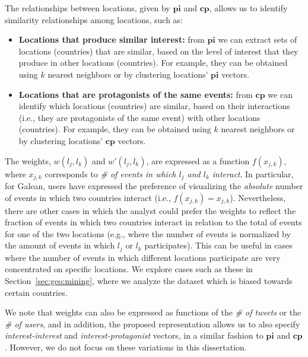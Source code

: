 The relationships between locations, given by $\mathbf{pi}$ and $\mathbf{cp}$,
allows us to identify similarity relationships among locations, such as:

\begin{itemize}
\item{\bf Locations that produce similar interest:} 
%
from $\mathbf{pi}$ we can extract sets of locations (countries) that are
similar, based on the level of interest that they produce in other locations
(countries). 
%
For example, they can be obtained using $k$ nearest neighbors or by clustering
locations' $\mathbf{pi}$ vectors.

\item{\bf Locations that are protagonists of the same events:} 
%
from $\mathbf{cp}$ we can identify which locations (countries) are similar,
based on their interactions (i.e., they are protagonists of the same event) with
other locations (countries). 
%
For example, they can be obtained using $k$ nearest neighbors or by clustering
locations' $\mathbf{cp}$ vectors.
\end{itemize}

The weights, $w(l_j,l_k)$ and $w'(l_j,l_k)$, are expressed as a function
$f(x_{j,k})$, where $x_{j,k}$ corresponds to {\em \# of events in which $l_j$
and $l_k$ interact}. 
%
In particular, for Galean, users have expressed the preference of visualizing
the {\em absolute} number of events in which two countries interact (i.e.,
$f(x_{j,k})=x_{j,k}$).  
%
Nevertheless, there are other cases in which the analyst could prefer the
weights to reflect the fraction of events in which two countries interact in
relation to the total of events for one of the two locations (e.g., where the
number of events is normalized by the amount of events in which $l_j$ or $l_k$
participates).
%
This can be useful in cases where the number of events in which different
locations participate are very concentrated on specific locations. 
%
We explore cases such as these in Section~\ref{sec:geo:mining}, where we analyze
the dataset which is biased towards certain countries.


We note that weights can also be expressed as functions of the {\em \# of
tweets} or the {\em \# of users}, and in addition, the proposed representation
allows us to also specify {\em interest-interest} and {\em interest-protagonist}
vectors, in a similar fashion to $\mathbf{pi}$ and $\mathbf{cp}$. 
%
However, we do not focus on these variations in this dissertation.

